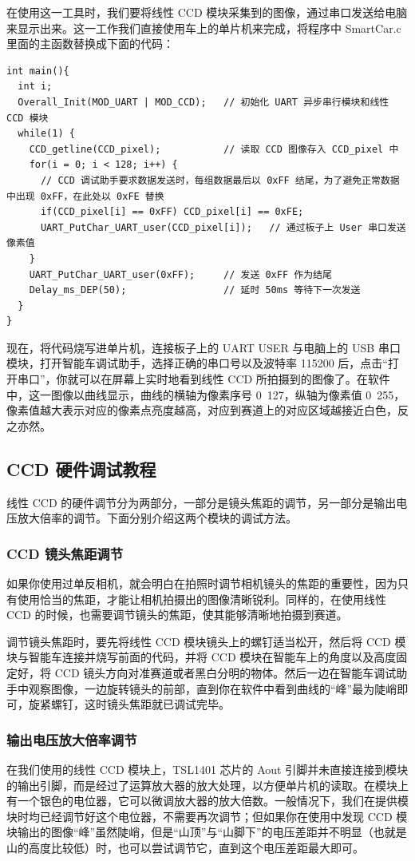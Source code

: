 在使用这一工具时，我们要将线性 CCD 模块采集到的图像，通过串口发送给电脑来显示出来。这一工作我们直接使用车上的单片机来完成，将程序中 SmartCar.c 里面的主函数替换成下面的代码：

\begin{verbatim}
int main(){
  int i;
  Overall_Init(MOD_UART | MOD_CCD);   // 初始化 UART 异步串行模块和线性 CCD 模块
  while(1) {
    CCD_getline(CCD_pixel);           // 读取 CCD 图像存入 CCD_pixel 中
    for(i = 0; i < 128; i++) {
      // CCD 调试助手要求数据发送时，每组数据最后以 0xFF 结尾，为了避免正常数据中出现 0xFF，在此处以 0xFE 替换
      if(CCD_pixel[i] == 0xFF) CCD_pixel[i] == 0xFE;
      UART_PutChar_UART_user(CCD_pixel[i]);   // 通过板子上 User 串口发送像素值
    }
    UART_PutChar_UART_user(0xFF);     // 发送 0xFF 作为结尾
    Delay_ms_DEP(50);                 // 延时 50ms 等待下一次发送
  }
}
\end{verbatim}

现在，将代码烧写进单片机，连接板子上的 UART USER 与电脑上的 USB 串口模块，打开智能车调试助手，选择正确的串口号以及波特率 115200 后，点击“打开串口”，你就可以在屏幕上实时地看到线性 CCD 所拍摄到的图像了。在软件中，这一图像以曲线显示，曲线的横轴为像素序号 0~127，纵轴为像素值 0~255，像素值越大表示对应的像素点亮度越高，对应到赛道上的对应区域越接近白色，反之亦然。

\subsection{CCD 硬件调试教程}
线性 CCD 的硬件调节分为两部分，一部分是镜头焦距的调节，另一部分是输出电压放大倍率的调节。下面分别介绍这两个模块的调试方法。

\subsubsection{CCD 镜头焦距调节}
如果你使用过单反相机，就会明白在拍照时调节相机镜头的焦距的重要性，因为只有使用恰当的焦距，才能让相机拍摄出的图像清晰锐利。同样的，在使用线性 CCD 的时候，也需要调节镜头的焦距，使其能够清晰地拍摄到赛道。

调节镜头焦距时，要先将线性 CCD 模块镜头上的螺钉适当松开，然后将 CCD 模块与智能车连接并烧写前面的代码，并将 CCD 模块在智能车上的角度以及高度固定好，将 CCD 镜头方向对准赛道或者黑白分明的物体。然后一边在智能车调试助手中观察图像，一边旋转镜头的前部，直到你在软件中看到曲线的“峰”最为陡峭即可，旋紧螺钉，这时镜头焦距就已调试完毕。

\subsubsection{输出电压放大倍率调节}
在我们使用的线性 CCD 模块上，TSL1401 芯片的 Aout 引脚并未直接连接到模块的输出引脚，而是经过了运算放大器的放大处理，以方便单片机的读取。在模块上有一个银色的电位器，它可以微调放大器的放大倍数。一般情况下，我们在提供模块时均已经调节好这个电位器，不需要再次调节；但如果你在使用中发现 CCD 模块输出的图像“峰”虽然陡峭，但是“山顶”与“山脚下”的电压差距并不明显（也就是山的高度比较低）时，也可以尝试调节它，直到这个电压差距最大即可。



